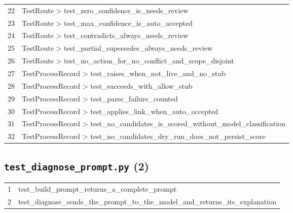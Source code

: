 \begin{longtable}{p{}p{}}
22 & TestRoute > test\_zero\_confidence\_is\_needs\_review \\
23 & TestRoute > test\_max\_confidence\_is\_auto\_accepted \\
24 & TestRoute > test\_contradicts\_always\_needs\_review \\
25 & TestRoute > test\_partial\_supersedes\_always\_needs\_review \\
26 & TestRoute > test\_no\_action\_for\_no\_conflict\_and\_scope\_disjoint \\
27 & TestProcessRecord > test\_raises\_when\_not\_live\_and\_no\_stub \\
28 & TestProcessRecord > test\_succeeds\_with\_allow\_stub \\
29 & TestProcessRecord > test\_parse\_failure\_counted \\
30 & TestProcessRecord > test\_applies\_link\_when\_auto\_accepted \\
31 & TestProcessRecord > test\_no\_candidates\_is\_scored\_without\_model\_classification \\
32 & TestProcessRecord > test\_no\_candidates\_dry\_run\_does\_not\_persist\_score \\
\end{longtable}
\subsection*{\texttt{test\_diagnose\_prompt.py} (2)}
\begin{longtable}{p{}p{}}
1 & test\_build\_prompt\_returns\_a\_complete\_prompt \\
2 & test\_diagnose\_sends\_the\_prompt\_to\_the\_model\_and\_returns\_its\_explanation \\
\end{longtable}
